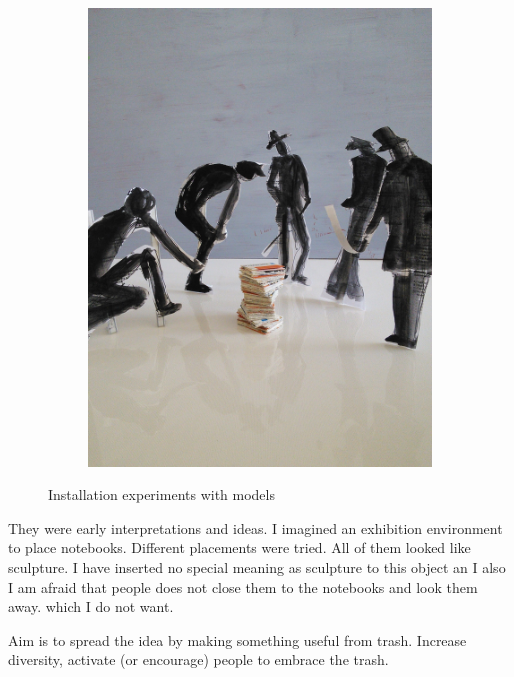 \begin{figure}
\begin{subfigure}[b]{0.3\textwidth}
        \includegraphics[width=\textwidth]{project_graphics/exhibition3.jpg}
        \label{fig:exhibition3}
    \end{subfigure}
    \caption{Installation experiments with models}
    \label{fig:exhibition}
\end{figure}

They were early interpretations and ideas. I imagined an exhibition environment to place notebooks. Different placements were tried. All of them looked like sculpture. I have inserted no special meaning as sculpture to this object an I also I am afraid that people does not close them to the notebooks and look them away. which I do not want.

Aim is to spread the idea by making something useful from trash. Increase diversity, activate (or encourage) people to embrace the trash.


